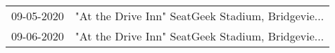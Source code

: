 \begin{supertabular}{ll}
 09-05-2020 &  "At the Drive Inn" SeatGeek Stadium, Bridgevie... \\
 09-06-2020 &  "At the Drive Inn" SeatGeek Stadium, Bridgevie... \\
\end{supertabular}
